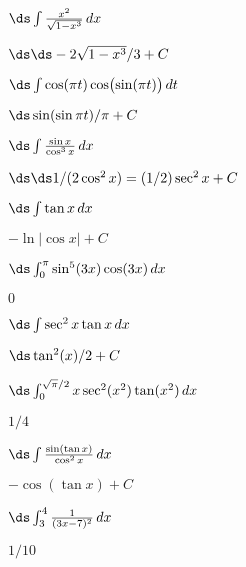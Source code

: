 \begin{exercises}
\begin{exercise} $\ds\int {x^2\over\sqrt{1-x^3}}\,dx$
\begin{answer} $\ds \ds -2\sqrt{1-x^3}/3+C$
\end{answer}\end{exercise}

\begin{exercise} $\ds\int \cos(\pi t)\cos\bigl(\sin(\pi t)\bigr)\,dt$
\begin{answer} $\ds \sin(\sin\pi t)/\pi+C$
\end{answer}\end{exercise}

\begin{exercise} $\ds\int {\sin x\over\cos^3 x}\,dx$
\begin{answer} $\ds \ds 1/(2\cos^2 x)=(1/2)\sec^2x+C$
\end{answer}\end{exercise}

\begin{exercise} $\ds\int\tan x\,dx$
\begin{answer} $-\ln|\cos x|+C$
\end{answer}\end{exercise}

\begin{exercise}  $\ds\int_0^\pi\sin^5(3x)\cos(3x)\,dx$
\begin{answer} $0$
\end{answer}\end{exercise}

\begin{exercise} $\ds\int\sec^2x\tan x\,dx$
\begin{answer} $\ds \tan^2(x)/2+C$
\end{answer}\end{exercise}

\begin{exercise} $\ds\int_0^{\sqrt{\pi}/2} x\sec^2(x^2)\tan(x^2)\,dx$
\begin{answer} $1/4$
\end{answer}\end{exercise}

\begin{exercise} $\ds\int {\sin(\tan x)\over\cos^2x}\,dx$
\begin{answer} $-\cos(\tan x)+C$
\end{answer}\end{exercise}

\begin{exercise} $\ds\int_3^4 {1\over(3x-7)^2}\,dx$
\begin{answer} $1/10$
\end{answer}\end{exercise}


\end{exercises}
